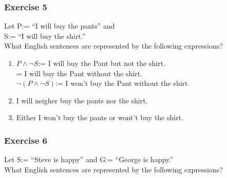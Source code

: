 \begin{questions}

\subsubsection{Exercise 5}

\question Let P:= “I will buy the pants” and \\
    S:= “I will buy the shirt.” \\
    What English sentences are represented by the following expressions?
\begin{solution}
    \begin{enumerate}[label=(\alph*)]
        \item $P \wedge \neg S$:= I will buy the Pant but not the shirt. \\
                            = I will buy the Pant without the shirt. \\
                $\neg (P \wedge \neg S)$:= I won't buy the Pant without the shirt.
        \item I will neigher buy the pants nor the shirt.
        \item Either I won't buy the pants or wont't buy the shirt.
    \end{enumerate}
\end{solution}


\subsubsection{Exercise 6}
\question Let S:= “Steve is happy” and G:= “George is happy.” \\
What English sentences are represented by the following expressions?


\end{questions}
